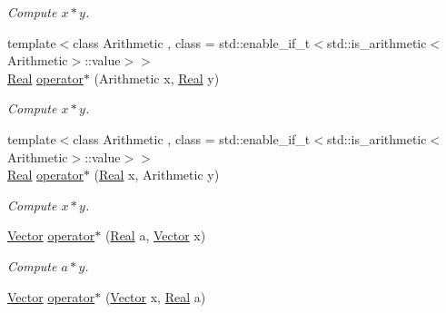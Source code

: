 \begin{DoxyCompactItemize}
\begin{DoxyCompactList}\small\item\em Compute $x*y$. \end{DoxyCompactList}\item 
\hypertarget{namespaceSpacy_a4e9ea51b184c04946f429263e56df92a}{}{\footnotesize template$<$class Arithmetic , class  = std\+::enable\+\_\+if\+\_\+t$<$std\+::is\+\_\+arithmetic$<$\+Arithmetic$>$\+::value$>$$>$ }\\\hyperlink{classSpacy_1_1Real}{Real} \hyperlink{namespaceSpacy_a4e9ea51b184c04946f429263e56df92a}{operator$\ast$} (Arithmetic x, \hyperlink{classSpacy_1_1Real}{Real} y)\label{namespaceSpacy_a4e9ea51b184c04946f429263e56df92a}

\begin{DoxyCompactList}\small\item\em Compute $x*y$. \end{DoxyCompactList}\item 
\hypertarget{namespaceSpacy_a9d19ae9f3266ca0613b90055c60b8ea8}{}{\footnotesize template$<$class Arithmetic , class  = std\+::enable\+\_\+if\+\_\+t$<$std\+::is\+\_\+arithmetic$<$\+Arithmetic$>$\+::value$>$$>$ }\\\hyperlink{classSpacy_1_1Real}{Real} \hyperlink{namespaceSpacy_a9d19ae9f3266ca0613b90055c60b8ea8}{operator$\ast$} (\hyperlink{classSpacy_1_1Real}{Real} x, Arithmetic y)\label{namespaceSpacy_a9d19ae9f3266ca0613b90055c60b8ea8}

\begin{DoxyCompactList}\small\item\em Compute $x*y$. \end{DoxyCompactList}\item 
\hypertarget{namespaceSpacy_a078a8d272a6293f6262e4440aec0a058}{}\hyperlink{classSpacy_1_1Vector}{Vector} \hyperlink{namespaceSpacy_a078a8d272a6293f6262e4440aec0a058}{operator$\ast$} (\hyperlink{classSpacy_1_1Real}{Real} a, \hyperlink{classSpacy_1_1Vector}{Vector} x)\label{namespaceSpacy_a078a8d272a6293f6262e4440aec0a058}

\begin{DoxyCompactList}\small\item\em Compute $a*y$. \end{DoxyCompactList}\item 
\hypertarget{namespaceSpacy_aa605c20cb4995fb23af42a6d5d6844a3}{}\hyperlink{classSpacy_1_1Vector}{Vector} \hyperlink{namespaceSpacy_aa605c20cb4995fb23af42a6d5d6844a3}{operator$\ast$} (\hyperlink{classSpacy_1_1Vector}{Vector} x, \hyperlink{classSpacy_1_1Real}{Real} a)\label{namespaceSpacy_aa605c20cb4995fb23af42a6d5d6844a3}


\end{DoxyCompactItemize}
